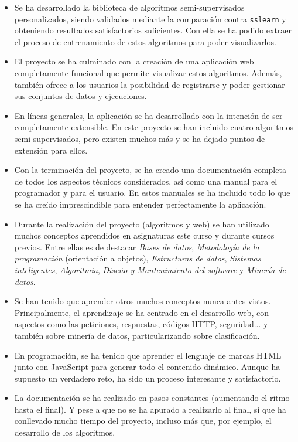 \begin{itemize}
    \item Se ha desarrollado la biblioteca de algoritmos semi-supervisados
    personalizados, siendo validados mediante la comparación contra
    \texttt{sslearn} y obteniendo resultados satisfactorios suficientes. Con
    ella se ha podido extraer el proceso de entrenamiento de estos algoritmos
    para poder visualizarlos.
    \item El proyecto se ha culminado con la creación de una aplicación web
    completamente funcional que permite visualizar estos algoritmos. Además,
    también ofrece a los usuarios la posibilidad de registrarse y poder
    gestionar sus conjuntos de datos y ejecuciones.
    \item En líneas generales, la aplicación se ha desarrollado con la intención
    de ser completamente extensible. En este proyecto se han incluido cuatro
    algoritmos semi-supervisados, pero existen muchos más y se ha dejado puntos
    de extensión para ellos.
    \item Con la terminación del proyecto, se ha creado una documentación
    completa de todos los aspectos técnicos considerados, así como una manual
    para el programador y para el usuario. En estos manuales se ha incluido todo
    lo que se ha creído imprescindible para entender perfectamente la
    aplicación.
    \item Durante la realización del proyecto (algoritmos y web) se han
    utilizado muchos conceptos aprendidos en asignaturas este curso y durante
    cursos previos. Entre ellas es de destacar \emph{Bases de datos},
    \emph{Metodología de la programación} (orientación a objetos),
    \emph{Estructuras de datos}, \emph{Sistemas inteligentes},
    \emph{Algoritmia}, \emph{Diseño y Mantenimiento del software} y
    \emph{Minería de datos}.
    \item Se han tenido que aprender otros muchos conceptos nunca antes vistos.
    Principalmente, el aprendizaje se ha centrado en el desarrollo web, con
    aspectos como las peticiones, respuestas, códigos HTTP, seguridad... y
    también sobre minería de datos, particularizando sobre clasificación.
    \item En programación, se ha tenido que aprender el lenguaje de marcas HTML junto
    con JavaScript para generar todo el contenido dinámico. Aunque ha supuesto
    un verdadero reto, ha sido un proceso interesante y satisfactorio.
    \item La documentación se ha realizado en pasos constantes (aumentando el
    ritmo hasta el final). Y pese a que no se ha apurado a realizarlo al final,
    sí que ha conllevado mucho tiempo del proyecto, incluso más que, por
    ejemplo, el desarrollo de los algoritmos.
\end{itemize}

